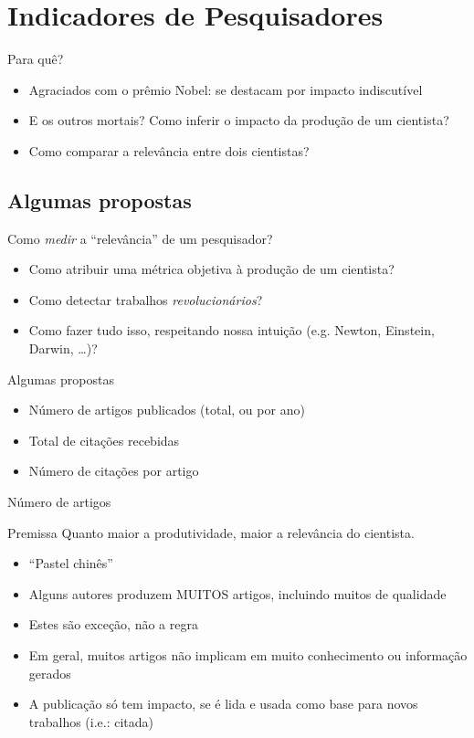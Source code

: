 \documentclass{beamer}
\begin{document}
\section{Indicadores de Pesquisadores}

\begin{frame}{Para quê?}
  \begin{itemize}
  \item Agraciados com o prêmio Nobel: se destacam por impacto indiscutível
  \item E os outros mortais? Como inferir o impacto da produção de um cientista?
  \item Como comparar a relevância entre dois cientistas?
  \end{itemize}
\end{frame}

\subsection{Algumas propostas}

\begin{frame}{Como {\em medir} a ``relevância'' de um pesquisador?}
  \begin{itemize}
  \item Como atribuir uma métrica objetiva à produção de um cientista?
  \item Como detectar trabalhos {\em revolucionários}?
  \item Como fazer tudo isso, respeitando nossa intuição (e.g. Newton, Einstein, Darwin, \ldots)?
  \end{itemize}
\end{frame}

\begin{frame}{Algumas propostas}
  \begin{itemize}
  \item Número de artigos publicados (total, ou por ano)
  \item Total de citações recebidas
  \item Número de citações por artigo
  \end{itemize}
\end{frame}

\begin{frame}{Número de artigos}
  \begin{block}{Premissa}
    Quanto maior a produtividade, maior a relevância do cientista.
  \end{block}
  \begin{itemize}
  \item ``Pastel chinês''
  \item Alguns autores produzem MUITOS artigos, incluindo muitos de qualidade
  \item Estes são exceção, não a regra
  \item Em geral, muitos artigos não implicam em muito conhecimento ou informação gerados
  \item A publicação só tem impacto, se é lida e usada como base para novos trabalhos (i.e.: \alert{citada})
  \end{itemize}
\end{frame}
\end{document}
